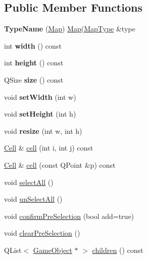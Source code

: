 \subsection*{\-Public \-Member \-Functions}
\begin{DoxyCompactItemize}
\item 
\hypertarget{class_map_ad0771dcdce4b2864508b4b9d6fa4453c}{{\bfseries \-Type\-Name} (\hyperlink{class_map}{\-Map}) \hyperlink{class_map}{\-Map}(\hyperlink{class_map_type}{\-Map\-Type} \&type}\label{class_map_ad0771dcdce4b2864508b4b9d6fa4453c}

\item 
\hypertarget{class_map_a4c35169a60acd3669f198e6c2d20dff5}{int {\bfseries width} () const }\label{class_map_a4c35169a60acd3669f198e6c2d20dff5}

\item 
\hypertarget{class_map_a009f197c2e488d8dd5f02b1a2920a15c}{int {\bfseries height} () const }\label{class_map_a009f197c2e488d8dd5f02b1a2920a15c}

\item 
\hypertarget{class_map_a028c347d88716e984c943f382f58b7ef}{\-Q\-Size {\bfseries size} () const }\label{class_map_a028c347d88716e984c943f382f58b7ef}

\item 
\hypertarget{class_map_a2915ccde4d8a2ba8142677baea803467}{void {\bfseries set\-Width} (int w)}\label{class_map_a2915ccde4d8a2ba8142677baea803467}

\item 
\hypertarget{class_map_affab3537641a7985559f83ea083e00ca}{void {\bfseries set\-Height} (int h)}\label{class_map_affab3537641a7985559f83ea083e00ca}

\item 
\hypertarget{class_map_a5f7c31af6620d00ce8a812c8710345ab}{void {\bfseries resize} (int w, int h)}\label{class_map_a5f7c31af6620d00ce8a812c8710345ab}

\item 
\hyperlink{class_cell}{\-Cell} \& \hyperlink{class_map_a6c94b3e99490efa0f170db132dc9f5b8}{cell} (int i, int j) const 
\item 
\hyperlink{class_cell}{\-Cell} \& \hyperlink{class_map_ae0b03b422a10edbfa7bd0b4bdd085793}{cell} (const \-Q\-Point \&p) const 
\item 
void \hyperlink{class_map_a16aea6b5c9de3a26b094d964885b33b7}{select\-All} ()
\item 
void \hyperlink{class_map_a5b85190575503a09c5c6de012da64f7c}{un\-Select\-All} ()
\item 
void \hyperlink{class_map_a89cab58d82e08dacfe0b97899bab5501}{confirm\-Pre\-Selection} (bool add=true)
\item 
void \hyperlink{class_map_a0a637f44f0a59c3a67b6a507ae710c7f}{clear\-Pre\-Selection} ()
\item 
\-Q\-List$<$ \hyperlink{class_game_object}{\-Game\-Object} $\ast$ $>$ \hyperlink{class_map_a939817aa7f5c9e81d3d2b1a42d9403e7}{children} () const 
\end{DoxyCompactItemize}
